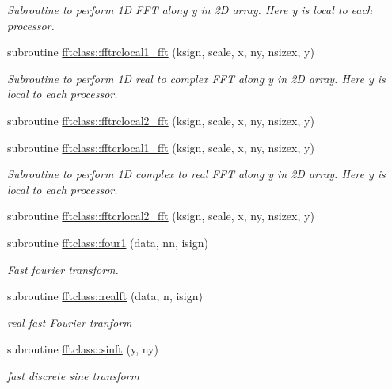 \begin{DoxyCompactItemize}
\begin{DoxyCompactList}\small\item\em Subroutine to perform 1D F\+FT along y in 2D array. Here y is local to each processor. \end{DoxyCompactList}\item 
subroutine \mbox{\hyperlink{namespacefftclass_af33a24fc1bf4d5763c335c0cef247e3c}{fftclass\+::fftrclocal1\+\_\+fft}} (ksign, scale, x, ny, nsizex, y)
\begin{DoxyCompactList}\small\item\em Subroutine to perform 1D real to complex F\+FT along y in 2D array. Here y is local to each processor. \end{DoxyCompactList}\item 
subroutine \mbox{\hyperlink{namespacefftclass_a83a1c8ccf853ae07fdfc5a80e1e244d1}{fftclass\+::fftrclocal2\+\_\+fft}} (ksign, scale, x, ny, nsizex, y)
\item 
subroutine \mbox{\hyperlink{namespacefftclass_a25ecfa928dd28501b9c251c1e887996b}{fftclass\+::fftcrlocal1\+\_\+fft}} (ksign, scale, x, ny, nsizex, y)
\begin{DoxyCompactList}\small\item\em Subroutine to perform 1D complex to real F\+FT along y in 2D array. Here y is local to each processor. \end{DoxyCompactList}\item 
subroutine \mbox{\hyperlink{namespacefftclass_a62d05d7b0980c823708d03f4a1520c1e}{fftclass\+::fftcrlocal2\+\_\+fft}} (ksign, scale, x, ny, nsizex, y)
\item 
subroutine \mbox{\hyperlink{namespacefftclass_a4597d420a1363f9fd0b652472d7caf52}{fftclass\+::four1}} (data, nn, isign)
\begin{DoxyCompactList}\small\item\em Fast fourier transform. \end{DoxyCompactList}\item 
subroutine \mbox{\hyperlink{namespacefftclass_a1aec6e8023ec23ff926a64c54c93ee1e}{fftclass\+::realft}} (data, n, isign)
\begin{DoxyCompactList}\small\item\em real fast Fourier tranform \end{DoxyCompactList}\item 
subroutine \mbox{\hyperlink{namespacefftclass_abcd5ef700f07a29fa9949e15866f5d41}{fftclass\+::sinft}} (y, ny)
\begin{DoxyCompactList}\small\item\em fast discrete sine transform \end{DoxyCompactList}\item 

\end{DoxyCompactItemize}
